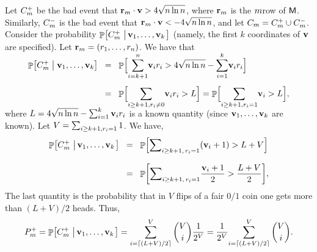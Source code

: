 Let $C_m^+$ be the bad event that
$\mathbf{r}_m \cdot \mathbf{v} > 4 \sqrt{n \ln n}$, where $\mathbf{r}_m$ is the
$m$\th row of $\mathsf{M}$.  Similarly, $C_m^-$ is the bad event that
$\mathbf{r}_m \cdot \mathbf{v} < -4 \sqrt{n \ln{n}}$, and let
$C_m = C_m^+ \cup C_m^-$.  Consider the probability
$\Prob{C_\ind^+ \sep{\vecA_1, \ldots, \vecA_k}}$ (namely, the first $k$
coordinates of $\mathbf{v}$ are specified).  Let
$\mathbf{r}_m = ({r}_1,\ldots, {r}_n)$.  We have that
\begin{align*}
    \ProbCond{C_\ind^+ }{\vecA_1, \ldots, \vecA_k}%
    &\EQ
    \Prob{\smash{\sum_{i=k+1}^{n}} \vecA_i \rowc_i > 4 \sqrt{n \ln{n}} -
       \smash{\sum_{i=1}^{k}} \vecA_i \rowc_i }%
    \\[0.4cm]&
    \EQ%
    \Prob{\Bigl.\smash{\sum_{i \geq k+1, \rowc_i \ne 0 }} \vecA_i \rowc_i >
       L}%
    =%
    \Prob{\Bigl. \smash{\sum_{i \geq k+1, \rowc_i = 1}} \vecA_i > L},
\end{align*}
where
\begin{math}
    L = 4 \sqrt{n \ln{n}} - \sum_{i=1}^{k} \mathbf{v}_i {r}_i
\end{math}
is a known quantity (since $\mathbf{v}_1, \ldots, \mathbf{v}_k$ are known). Let
$V = \sum_{i \geq k+1, {r}_i =1 } 1$. We have,
\begin{align*}
    \Prob{C_\ind^+ \sep{\vecA_1, \ldots, \vecA_k}} 
    &\EQ%
    \Prob{\Bigl. \smash{\displaystyle \sum\nolimits_{{i \geq k+1,\, \rowc_i = 1}} }\pth{ \vecA_i +
          1} > L + V}%
    \\[0.3cm]&%
    \EQ%
    \Prob{\Bigl. \smash{\sum\nolimits_{{i \geq k+1,\, \rowc_i = 1} }}\frac{{ \vecA_i +
             1}}{2} > \frac{L + V}{2}},
\end{align*}
%
\medskip%
The last quantity is the probability that in $V$ flips of a fair $0/1$
coin one gets more than $(L+V)/2$ heads. Thus,
\begin{equation*}
    P_\ind^+ = \Prob{C_\ind^+ \sep{\vecA_1, \ldots, \vecA_k}}
    =%
    \sum_{i = \ceil{(L+V)/2}}^{V} \binom{V}{i}
    \frac{1}{2^V}%
    =%
    \frac{1}{2^V} { \sum_{i = \ceil{(L+V)/2}}^{V}
       \binom{V}{i}}.    
\end{equation*}%
%
